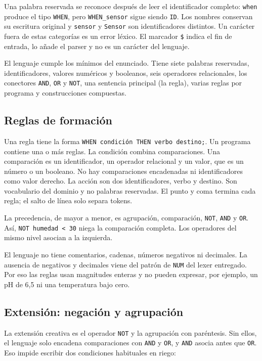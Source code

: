\documentclass[11pt,a4paper]{article}
\newcommand{\tk}[1]{\texttt{#1}}
\begin{document}
Una palabra reservada se reconoce después de leer el identificador
completo: \tk{when} produce el tipo \tk{WHEN}, pero \tk{WHEN\_sensor}
sigue siendo \tk{ID}. Los nombres conservan su escritura original y
\tk{sensor} y \tk{Sensor} son identificadores distintos. Un carácter
fuera de estas categorías es un error léxico. El marcador \tk{\$}
indica el fin de entrada, lo añade el parser y no es un carácter del lenguaje.

El lenguaje cumple los mínimos del enunciado. Tiene siete palabras
reservadas, identificadores, valores numéricos y booleanos, seis
operadores relacionales, los conectores \tk{AND}, \tk{OR} y \tk{NOT},
una sentencia principal (la regla), varias reglas por programa y
construcciones compuestas.

\subsection{Reglas de formación}

Una regla tiene la forma \tk{WHEN condición THEN verbo destino;}. Un
programa contiene una o más reglas. La condición combina
comparaciones. Una comparación es un identificador, un operador
relacional y un valor, que es un número o un booleano. No hay
comparaciones encadenadas ni identificadores como valor derecho. La
acción son dos identificadores, verbo y destino. Son vocabulario del
dominio y no palabras reservadas. El punto y coma termina cada regla;
el salto de línea solo separa tokens.

La precedencia, de mayor a menor, es agrupación, comparación,
\tk{NOT}, \tk{AND} y \tk{OR}. Así, \tk{NOT humedad < 30} niega la
comparación completa. Los operadores del mismo nivel asocian a la izquierda.

El lenguaje no tiene comentarios, cadenas, números negativos ni
decimales. La ausencia de negativos y decimales viene del patrón de
\tk{NUM} del lexer entregado. Por eso las reglas usan magnitudes
enteras y no pueden expresar, por ejemplo, un pH de 6,5 ni una
temperatura bajo cero.

\subsection{Extensión: negación y agrupación}

La extensión creativa es el operador \tk{NOT} y la agrupación con
paréntesis. Sin ellos, el lenguaje solo encadena comparaciones con
\tk{AND} y \tk{OR}, y \tk{AND} asocia antes que \tk{OR}. Eso impide
escribir dos condiciones habituales en riego:
\end{document}
